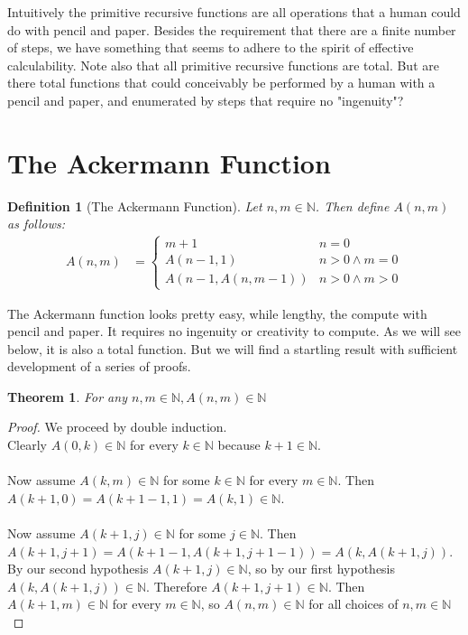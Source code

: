 \documentclass[12pt, letterpaper]{article}
\newtheorem{theorem}{Theorem}
\newtheorem*{definition}{Definition}
\theoremstyle{case}
\begin{document}
  Intuitively the primitive recursive functions are all operations that a human could do with pencil and paper.
  Besides the requirement that there are a finite number of steps, we have something that seems to adhere
  to the spirit of effective calculability. Note also that all primitive recursive functions are total.
  But are there total functions that could conceivably be performed by a human with a pencil and paper, and 
  enumerated by steps that require no "ingenuity"?

  \section{The Ackermann Function}
    \begin{definition}[The Ackermann Function]
      Let $n, m \in \mathbb{N}$. Then define $A(n, m)$ as follows:
      \begin{equation*}
        \begin{aligned}
          A(n, m) &=
          \begin{cases}
            m + 1                   & n = 0 \\
            A(n - 1, 1)             & n > 0 \wedge m = 0 \\
            A(n - 1, A(n, m - 1))   & n > 0 \wedge m > 0
          \end{cases}
        \end{aligned}
      \end{equation*}
    \end{definition}

    The Ackermann function looks pretty easy, while lengthy, the compute with pencil and paper. It requires no ingenuity
    or creativity to compute. As we will see below, it is also a total function. But we will find a startling result
    with sufficient development of a series of proofs.

    \begin{theorem}
      \label{inN}
      For any $n, m \in \mathbb{N}, A(n, m) \in \mathbb{N}$
    \end{theorem}
    \begin{proof}
      We proceed by double induction. \\
      Clearly $A(0, k) \in \mathbb{N}$ for every $k \in \mathbb{N}$ because $k + 1 \in \mathbb{N}$.
      \\
      \\
      Now assume $A(k, m) \in \mathbb{N}$ for some $k \in \mathbb{N}$ for every $m \in \mathbb{N}$.
      Then $A(k + 1, 0) = A(k + 1 - 1, 1) = A(k, 1) \in \mathbb{N}$.
      \\
      \\
      Now assume $A(k + 1, j) \in \mathbb{N}$ for some $j \in \mathbb{N}$.
      Then $A(k + 1, j + 1) = A(k + 1 - 1, A(k + 1, j + 1 - 1)) = A(k, A(k + 1, j))$.
      By our second hypothesis $A(k + 1, j) \in \mathbb{N}$, so by our first hypothesis $A(k, A(k + 1, j)) \in \mathbb{N}$.
      Therefore $A(k + 1, j + 1) \in \mathbb{N}$. Then $A(k + 1, m) \in \mathbb{N}$ for every $m \in \mathbb{N}$, so
      $A(n, m) \in \mathbb{N}$ for all choices of $n, m \in \mathbb{N}$
    \end{proof}
\end{document}
